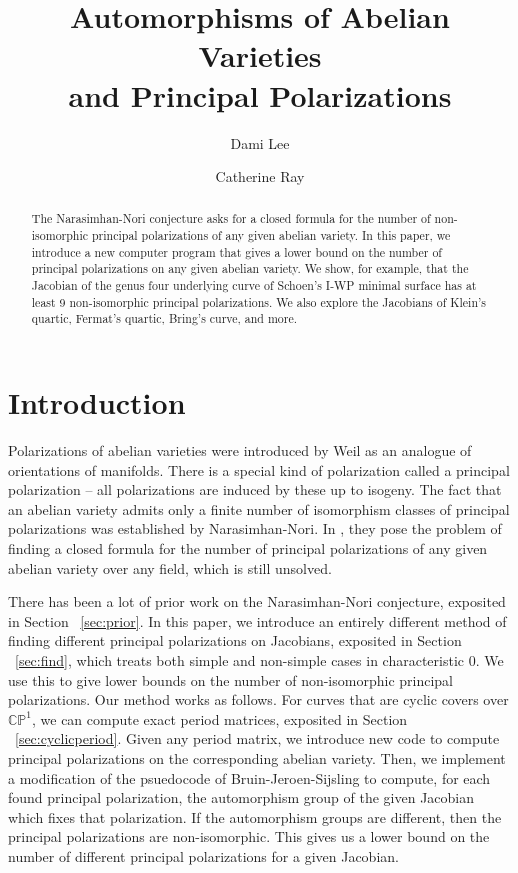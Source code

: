 \documentclass[12pt,reqno]{amsart}
\title[Automorphisms of Abelian Varieties and Principal Polarizations]{Automorphisms of Abelian Varieties \\ and Principal Polarizations}
\author{Dami Lee}
\author{Catherine Ray}
\newcommand{\C}{\mathbb{C}}
\newcommand{\bb}{\mathbb}
\renewcommand{\P}{\mathbb{P}}
\theoremstyle{definition}
\theoremstyle{remark}
\begin{document}
  
\maketitle

\begin{abstract} %
The Narasimhan-Nori conjecture asks for a closed formula for the number of non-isomorphic principal polarizations of any given abelian variety. In this paper, we introduce a new computer program that gives a lower bound on the number of principal polarizations on any given abelian variety. We show, for example, that the Jacobian of the genus four underlying curve of Schoen's I-WP minimal surface has at least 9 non-isomorphic principal polarizations. We also explore the Jacobians of Klein's quartic, Fermat's quartic, Bring's curve, and more.   
\end{abstract}

\tableofcontents

\section{Introduction}


Polarizations of abelian varieties were introduced by Weil as an analogue of orientations of manifolds. There is a special kind of polarization called a principal polarization -- all polarizations are induced by these up to isogeny. The fact that an abelian variety admits only a finite number of isomorphism classes of principal polarizations was established by Narasimhan-Nori. In \cite{nn}, they pose the problem of finding a closed formula for the number of principal polarizations of any given abelian variety over any field, which is still unsolved.

There has been a lot of prior work on the Narasimhan-Nori conjecture, exposited in Section ~\ref{sec:prior}. In this paper, we introduce an entirely different method of finding different principal polarizations on Jacobians, exposited in Section ~\ref{sec:find}, which treats both simple and non-simple cases in characteristic 0. We use this to give lower bounds on the number of non-isomorphic principal polarizations. Our method works as follows. For curves that are cyclic covers over $\C\bb{P}^1$, we can compute exact period matrices, exposited in Section ~\ref{sec:cyclicperiod}. Given any period matrix, we introduce new code to compute principal polarizations on the corresponding abelian variety. Then, we implement a modification of the psuedocode of Bruin-Jeroen-Sijsling \cite{numerical} to compute, for each found principal polarization, the automorphism group of the given Jacobian which fixes that polarization. If the automorphism groups are different, then the principal polarizations are non-isomorphic. This gives us a lower bound on the number of different principal polarizations for a given Jacobian. %
\end{document}
